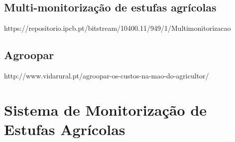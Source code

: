 \subsection{Multi-monitorização de estufas agrícolas }

https://repositorio.ipcb.pt/bitstream/10400.11/949/1/Multimonitorizacao%

\subsection{Agroopar}

http://www.vidarural.pt/agroopar-os-custos-na-mao-do-agricultor/


\section{Sistema de Monitorização de Estufas Agrícolas}


\cite{Abreu2012}